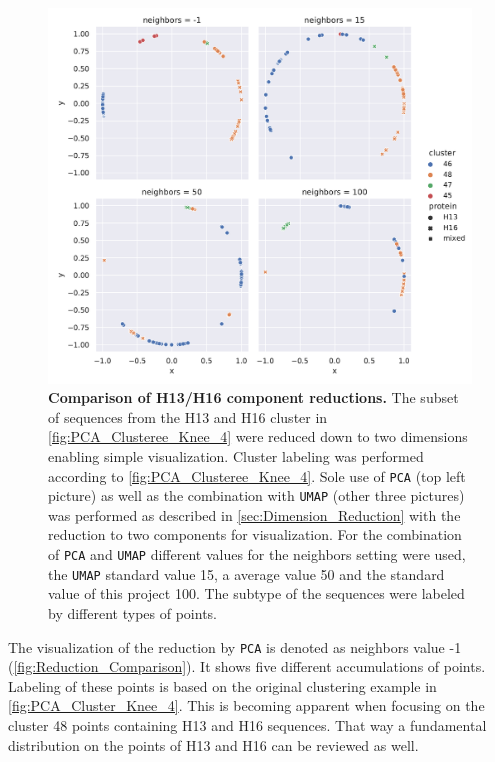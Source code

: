 \begin{figure}[!hbt]
    \centering
    \includegraphics[width=\textwidth]{PCA/Difference_Segment_4_H_metric_cosine.pdf}
    \caption[Comparison of H13/H16 component reductions]{\textbf{Comparison of H13/H16 component reductions.} The subset of sequences from the H13 and H16 cluster in \autoref{fig:PCA_Clusteree_Knee_4} were reduced down to two dimensions enabling simple visualization. Cluster labeling was performed according to \autoref{fig:PCA_Clusteree_Knee_4}. Sole use of \texttt{PCA} (top left picture) as well as the combination with \texttt{UMAP} (other three pictures) was performed as described in \autoref{sec:Dimension_Reduction} with the reduction to two components for visualization. For the combination of \texttt{PCA} and \texttt{UMAP} different values for the neighbors setting were used, the \texttt{UMAP} standard value 15, a average value 50 and the standard value of this project 100. The subtype of the sequences were labeled by different types of points.}
    \label{fig:Reduction_Comparison}
\end{figure}

The visualization of the reduction by \texttt{PCA} is denoted as neighbors value -1 (\autoref{fig:Reduction_Comparison}). It shows five different accumulations of points. Labeling of these points is based on the original clustering example in \autoref{fig:PCA_Cluster_Knee_4}. This is becoming apparent when focusing on the cluster 48 points containing H13 and H16 sequences. That way a fundamental distribution on the points of H13 and H16 can be reviewed as well. 

